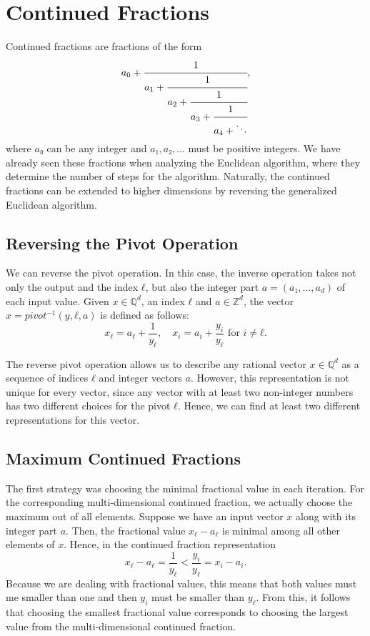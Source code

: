 \chapter{Continued Fractions}

Continued fractions are fractions of the form
\[
  a_0 + \cfrac{1}{a_1 + \cfrac{1}{a_2 + \cfrac{1}{a_3 + \cfrac{1}{a_4 + \ddots}}}},
\]
where $a₀$ can be any integer and $a₁, a₂, \dots$ must be positive integers.
We have already seen these fractions when analyzing the Euclidean algorithm,
where they determine the number of steps for the algorithm.
Naturally, the continued fractions can be extended to higher dimensions by
reversing the generalized Euclidean algorithm.

\section{Reversing the Pivot Operation}

We can reverse the pivot operation.
In this case, the inverse operation takes not only the output and the index $ℓ$,
but also the integer part $a = (a₁, \dots, a_d)$ of each input value.
Given $x ∈ ℚ^d$, an index $ℓ$ and $a ∈ ℤ^d$, the vector $x = pivot^{-1}(y, ℓ, a)$ is defined as follows:
\[
  x_ℓ = a_ℓ + \frac{1}{y_ℓ}, \quad x_i = a_i + \frac{y_i}{y_ℓ} \text{ for } i ≠ ℓ.
\]

The reverse pivot operation allows us to describe any rational vector $x ∈ ℚ^d$ as a
sequence of indices $ℓ$ and integer vectors $a$.
However, this representation is not unique for every vector,
since any vector with at least two non-integer numbers has two different
choices for the pivot $ℓ$.
Hence, we can find at least two different representations for this vector.

\section{Maximum Continued Fractions}

The first strategy was choosing the minimal fractional value in each iteration.
For the corresponding multi-dimensional continued fraction,
we actually choose the maximum out of all elements.
Suppose we have an input vector $x$ along with its integer part $a$.
Then, the fractional value $x_ℓ - a_ℓ$ is minimal among all other elements of $x$.
Hence, in the continued fraction representation
\[
  x_ℓ - a_ℓ = \frac{1}{y_ℓ} < \frac{y_i}{y_ℓ} = x_i - a_i.
\]
Because we are dealing with fractional values, this means that both values must
me smaller than one and then $y_i$ must be smaller than $y_ℓ$.
From this, it follows that choosing the smallest fractional value corresponds
to choosing the largest value from the multi-dimensional continued fraction.

